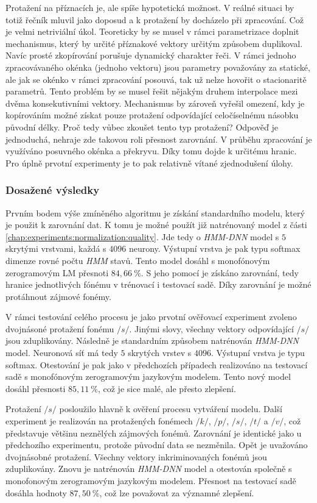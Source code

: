 Protažení na příznacích je, ale spíše hypotetická možnost. V reálné situaci by totiž řečník mluvil jako doposud a k protažení by docházelo při zpracování. Což je velmi netriviální úkol. Teoreticky by se musel v rámci parametrizace doplnit mechanismus, který by určité příznakové vektory určitým způsobem duplikoval. Navíc prosté zkopírování porušuje dynamický charakter řeči. V rámci jednoho zpracovávaného okénka (jednoho vektoru) jsou parametry považovány za statické, ale jak se okénko v rámci zpracování posouvá, tak už nelze hovořit o stacionaritě parametrů. Tento problém by se musel řešit nějakým druhem interpolace mezi dvěma konsekutivními vektory. Mechanismus by zároveň vyřešil omezení, kdy je kopírováním možné získat pouze protažení odpovídající celočíselnému násobku původní délky. Proč tedy vůbec zkoušet tento typ protažení? Odpověď je jednoduchá, nehraje zde takovou roli přesnost zarovnání. V průběhu zpracování je využíváno posuvného okénka a překryvu. Díky tomu dojde k určitému  hranic. Pro úplně prvotní experimenty je to pak relativně vítané zjednodušení úlohy.

\subsubsection{Dosažené výsledky}

Prvním bodem výše zmíněného algoritmu je získání standardního modelu, který je použit k zarovnání dat. K tomu je možné použít již natrénovaný model z části \ref{chap:experiments:normalization:quality}. Jde tedy o \textit{HMM-DNN} model s $5$ skrytými vrstvami, každá s $4096$ neurony. Výstupní vrstva je pak typu softmax dimenze rovné počtu \textit{HMM} stavů. Tento model dosáhl s monofónovým zerogramovým LM přesnoti $84,66\ \%$. S jeho pomocí je získáno zarovnání, tedy hranice jednotlivých fónému v trénovací i testovací sadě. Díky zarovnání je možné protáhnout zájmové fonémy.

V rámci testování celého procesu je jako prvotní ověřovací experiment zvoleno dvojnásoné protažení fonému $/s/$. Jinými slovy, všechny vektory odpovídající $/s/$ jsou zduplikovány. Následně je standardním způsobem natrénován \textit{HMM-DNN} model. Neuronová síť má tedy $5$ skrytých vrstev s $4096$. Výstupní vrstva je typu softmax. Otestování je pak jako v předchozích případech realizováno na testovací sadě s monofónovým zerogramovým jazykovým modelem. Tento nový model dosáhl přesnosti $85,11\ \%$, což je sice malé, ale přesto zlepšení.

Protažení $/s/$ posloužilo hlavně k ověření procesu vytváření modelu. Další experiment je realizován na protažených fonémech $/k/$, $/p/$, $/s/$, $/t/$ a $/v/$, což představuje většinu neznělých zájmových fonémů. Zarovnání je identické jako u předchozího experimentu, protože původní data se nezměnila. Opět je uvažováno dvojnásobné protažení. Všechny vektory inkriminovaných fonémů jsou zduplikovány. Znovu je natrénován \textit{HMM-DNN} model a otestován společně s monofonovým zerogramovým jazykovým modelem. Přesnost na testovací sadě dosáhla hodnoty $87,50\ \%$, což lze považovat za významné zlepšení.

